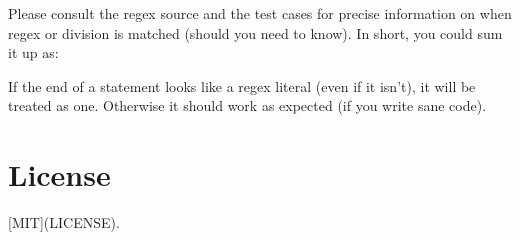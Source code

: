 Please consult the regex source and the test cases for precise information on when regex or division is matched (should you need to know). In short, you could sum it up as\+:

If the end of a statement looks like a regex literal (even if it isn’t), it will be treated as one. Otherwise it should work as expected (if you write sane code).

\section*{License }

\mbox{[}M\+IT\mbox{]}(L\+I\+C\+E\+N\+SE). 